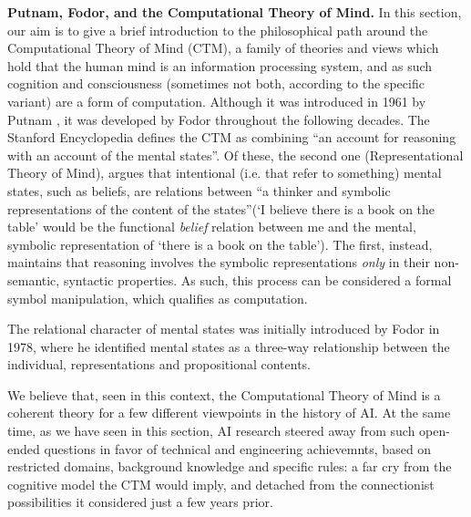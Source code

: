 \documentclass[../main.tex]{subfiles}
\begin{document}
\vspace{4pt}
\textbf{Putnam, Fodor, and the Computational Theory of Mind.}
In this section, our aim is to give a brief introduction to the philosophical path around the Computational Theory of Mind (CTM), a family of theories and views which hold that the human mind is an information processing system, and as such cognition and consciousness (sometimes not both, according to the specific variant) are a form of computation. Although it was introduced in 1961 by Putnam \cite{horstComputationalTheoryMind2003}, it was developed by Fodor throughout the following decades. The Stanford Encyclopedia defines the CTM as combining ``an account for reasoning with an account of the mental states''. Of these, the second one (Representational Theory of Mind), argues that intentional (i.e. that refer to something) mental states, such as beliefs, are relations between ``a thinker and symbolic representations of the content of the states''(`I believe there is a book on the table' would be the functional \textit{belief} relation between me and the mental, symbolic representation of `there is a book on the table'). The first, instead, maintains that reasoning involves the symbolic representations \textit{only} in their non-semantic, syntactic properties. As such, this process can be considered a formal symbol manipulation, which qualifies as computation.

The relational character of mental states was initially introduced by Fodor in 1978\cite{fodorPropositionalAttitudes1978}, where he identified mental states as a three-way relationship between the individual, representations and propositional contents.

\vspace{5pt}
We believe that, seen in this context, the Computational Theory of Mind is a coherent theory for a few different viewpoints in the history of AI. At the same time, as we have seen in this section, AI research steered away from such open-ended questions in favor of technical and engineering achievemnts, based on restricted domains, background knowledge and specific rules: a far cry from the cognitive model the CTM would imply, and detached from the connectionist possibilities it considered just a few years prior.
\end{document}
